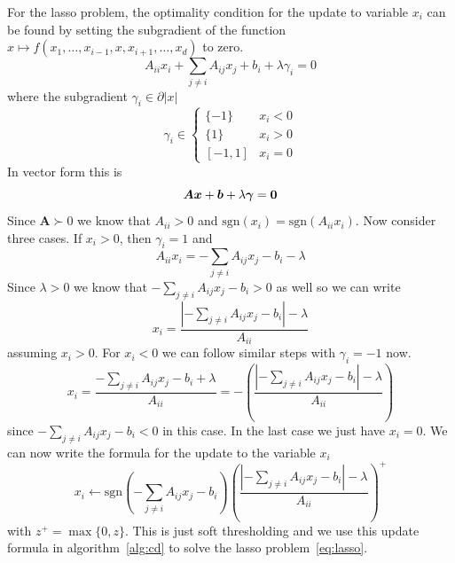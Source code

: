 \documentclass[10pt, letterpaper]{article}
\newcommand{\bx}{\boldsymbol x} %
\newcommand{\sgn}[1]{\mathrm{sgn}\left( #1 \right) }
\newcommand{\bzero}{{\bf 0}}
\begin{document}
For the lasso problem, the optimality condition for the update to variable $x_i$ can be found by setting the subgradient of the function $x\mapsto f(x_1,\ldots,x_{i-1}, x , x_{i+1}, \ldots, x_d)$ to zero.
\[
A_{ii}x_i + \sum_{j\neq i}A_{ij}x_j + b_i + \lambda \gamma_i = 0
\] 
where the subgradient $\gamma_i \in \partial |x|$
\[
\gamma_i \in  \begin{cases}
\{-1\}  & x_i < 0\\
\{1\}   & x_i > 0\\
[-1,1] & x_i = 0
\end{cases}
\]
In vector form this is 
\begin{equation}
{\boldsymbol A}\bx + {\boldsymbol b} + \lambda {\boldsymbol \gamma} = \bzero
\label{eq:lasso_kkt}
\end{equation}
Since ${\boldsymbol A} \succ 0$ we know that $A_{ii} > 0$ and $\sgn{x_i} = \sgn{A_{ii}x_i}$.  Now consider three cases.  If $x_i > 0$, then $\gamma_i = 1$ and
\[
A_{ii}x_i = - \sum_{j\neq i}A_{ij}x_j - b_i - \lambda
\]
Since $\lambda > 0$ we know that $- \sum_{j\neq i}A_{ij}x_j - b_i > 0$ as well so we can write
\[
x_i = \frac{ \left| - \sum_{j\neq i}A_{ij}x_j - b_i \right| - \lambda }{A_{ii}}
\]
assuming $x_i > 0$.  For $x_i < 0$ we can follow similar steps with $\gamma_i = -1$ now.
\[
x_i = \frac{- \sum_{j\neq i}A_{ij}x_j - b_i + \lambda}{A_{ii}} = -\left( \frac{\left| - \sum_{j\neq i}A_{ij}x_j - b_i \right| - \lambda}{A_{ii}} \right)
\]
since $- \sum_{j\neq i}A_{ij}x_j - b_i < 0$ in this case.
In the last case we just have $x_i=0$.  We can now write the formula for the update to the variable $x_i$
\begin{equation}
x_i \leftarrow \sgn{  - \sum_{j\neq i}A_{ij}x_j - b_i  } \left(  \frac{\left| - \sum_{j\neq i}A_{ij}x_j - b_i \right| - \lambda}{A_{ii}} \right)^+
\label{eq:lasso_update}
\end{equation}
with $z^+ = \max\{0,z\}$.  This is just soft thresholding and we use this update formula in algorithm~\ref{alg:cd} to solve the lasso problem~\ref{eq:lasso}.\\
\end{document}
